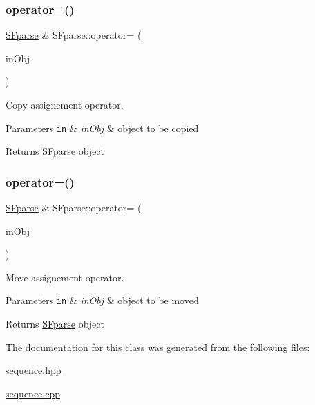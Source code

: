\subsubsection{\texorpdfstring{operator=()}{operator=()}\hspace{0.1cm}{\footnotesize\ttfamily [1/2]}}
{\footnotesize\ttfamily \hyperlink{class_s_fparse}{S\+Fparse} \& S\+Fparse\+::operator= (\begin{DoxyParamCaption}\item[{const \hyperlink{class_s_fparse}{S\+Fparse} \&}]{in\+Obj }\end{DoxyParamCaption})}



Copy assignement operator. 


\begin{DoxyParams}[1]{Parameters}
\mbox{\tt in}  & {\em in\+Obj} & object to be copied\\
\hline
\end{DoxyParams}
\begin{DoxyReturn}{Returns}
\hyperlink{class_s_fparse}{S\+Fparse} object 
\end{DoxyReturn}
\mbox{\label{class_s_fparse_afde939079361531d7373ee8c0dc75151}} 
\subsubsection{\texorpdfstring{operator=()}{operator=()}\hspace{0.1cm}{\footnotesize\ttfamily [2/2]}}
{\footnotesize\ttfamily \hyperlink{class_s_fparse}{S\+Fparse} \& S\+Fparse\+::operator= (\begin{DoxyParamCaption}\item[{\hyperlink{class_s_fparse}{S\+Fparse} \&\&}]{in\+Obj }\end{DoxyParamCaption})}



Move assignement operator. 


\begin{DoxyParams}[1]{Parameters}
\mbox{\tt in}  & {\em in\+Obj} & object to be moved\\
\hline
\end{DoxyParams}
\begin{DoxyReturn}{Returns}
\hyperlink{class_s_fparse}{S\+Fparse} object 
\end{DoxyReturn}


The documentation for this class was generated from the following files\+:\begin{DoxyCompactItemize}
\item 
\hyperlink{sequence_8hpp}{sequence.\+hpp}\item 
\hyperlink{sequence_8cpp}{sequence.\+cpp}\end{DoxyCompactItemize}
